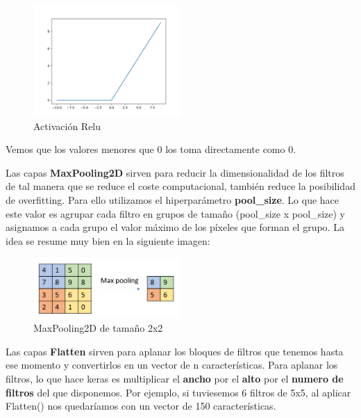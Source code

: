 \vspace{5 mm}

\begin{figure}[H]
\centering
  \includegraphics[width=0.5\textwidth]{Imagenes/relu.png}
   \caption{Activación Relu}
\end{figure}

\vspace{5 mm}

Vemos que los valores menores que 0 los toma directamente como 0.

\newpage

Las capas \textbf{MaxPooling2D} sirven para reducir la dimensionalidad de los filtros de tal manera que se reduce el coste computacional, también reduce la posibilidad de overfitting. Para ello utilizamos el hiperparámetro \textbf{pool\_size}. Lo que hace este valor es agrupar cada filtro en grupos de tamaño (pool\_size x pool\_size) y asignamos a cada grupo el valor máximo de los píxeles que forman el grupo. La idea se resume muy bien en la siguiente imagen:

\vspace{5 mm}

\begin{figure}[H]
\centering
  \includegraphics[width=0.5\textwidth]{Imagenes/pooling.jpg}
   \caption{MaxPooling2D de tamaño 2x2}
\end{figure}

\vspace{5 mm}

Las capas \textbf{Flatten} sirven para aplanar los bloques de filtros que tenemos hasta ese momento y convertirlos en un vector de n características. Para aplanar los filtros, lo que hace keras es multiplicar el \textbf{ancho} por el \textbf{alto} por el \textbf{numero de filtros} del que disponemos. Por ejemplo, si tuviesemos 6 filtros de 5x5, al aplicar Flatten() nos quedaríamos con un vector de 150 características.

